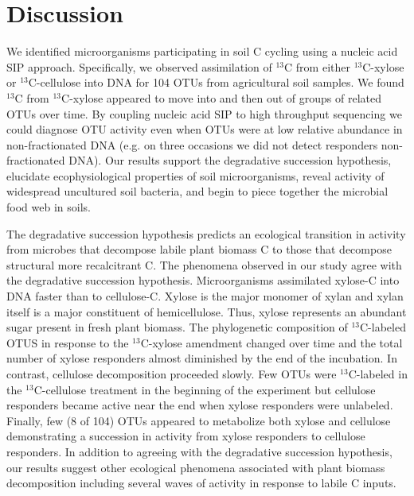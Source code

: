 \section{Discussion} 
We identified microorganisms participating in soil C cycling using a nucleic
acid SIP approach. Specifically, we observed assimilation of $^{13}$C from
either $^{13}$C-xylose or $^{13}$C-cellulose into DNA for 104 OTUs from
agricultural soil samples. We found $^{13}$C from $^{13}$C-xylose appeared to
move into and then out of groups of related OTUs over time. By coupling nucleic
acid SIP to high throughput sequencing we could diagnose OTU activity even when
OTUs were at low relative abundance in non-fractionated DNA (e.g. on three
occasions we did not detect responders non-fractionated DNA). Our results
support the degradative succession hypothesis, elucidate ecophysiological
properties of soil microorganisms, reveal activity of widespread
uncultured soil bacteria, and begin to piece together the microbial food
web in soils. 

The degradative succession hypothesis predicts an ecological transition in
activity from microbes that decompose labile plant biomass C to those that
decompose structural more recalcitrant C. The phenomena observed in our study
agree with the degradative succession hypothesis. Microorganisms assimilated
xylose-C into DNA faster than to cellulose-C. Xylose is the major monomer of
xylan and xylan itself is a major constituent of hemicellulose. Thus, xylose
represents an abundant sugar present in fresh plant biomass. The phylogenetic
composition of $^{13}$C-labeled OTUS in response to the $^{13}$C-xylose
amendment changed over time and the total number of xylose responders almost
diminished by the end of the incubation. In contrast, cellulose
decomposition proceeded slowly. Few OTUs were $^{13}$C-labeled in the
$^{13}$C-cellulose treatment in the beginning of the experiment but
cellulose responders became active near the end when xylose responders
were unlabeled. Finally, few (8 of 104) OTUs appeared to metabolize both
xylose and cellulose demonstrating a succession in activity from xylose
responders to cellulose responders. In addition to agreeing with the
degradative succession hypothesis, our results suggest other ecological
phenomena associated with plant biomass decomposition including several
waves of activity in response to labile C inputs.  

